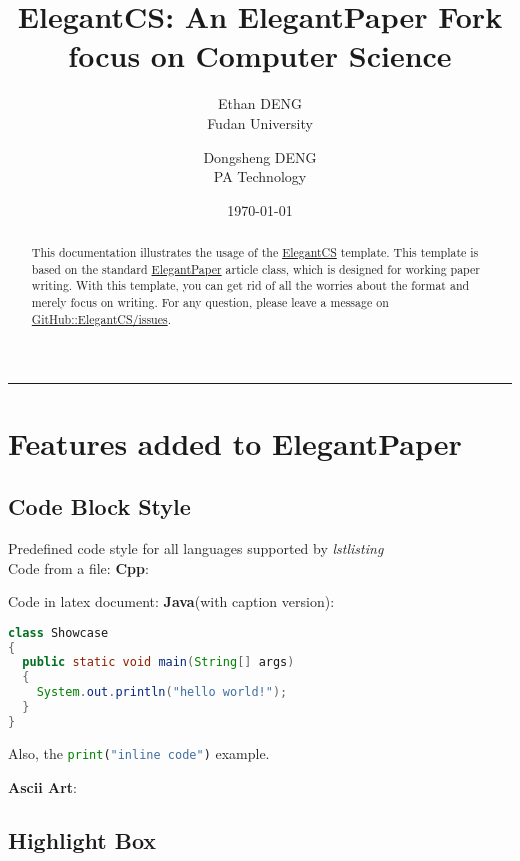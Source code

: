 \documentclass[lang=cn,a4paper,bibend=bibtex]{elegantcs}
\title{ElegantCS: An ElegantPaper Fork focus on Computer Science}
\author{Ethan DENG \\ Fudan University \and Dongsheng DENG \\ PA Technology}
\institute{\href{https://github.com/ElegantLaTeX}{Elegant\LaTeX{} Program}}
\date{\today}
\begin{document}
\maketitle

\begin{abstract}
This documentation illustrates the usage of the \href{https://github.com/Ziqi-Yang/ElegantCS}{ElegantCS} template. This template is based on the standard \href{https://github.com/ElegantLaTeX/ElegantPaper}{ElegantPaper} article class, which is designed for working paper writing. With this template, you can get rid of all the worries about the format and merely focus on writing. For any question, please leave a message on \href{https://github.com/Ziqi-Yang/ElegantCS/issues}{GitHub::ElegantCS/issues}.\par
{}
\end{abstract}


\noindent\rule{\textwidth}{1pt}

\section*{Features added to ElegantPaper}

\subsection*{Code Block Style}

Predefined code style for all languages supported by \textit{lstlisting}\\
Code from a file:
\textbf{Cpp}:


Code in latex document:
\textbf{Java}(with caption version):
\begin{lstlisting}[language=Java, caption={Showcase.java}]
class Showcase
{
  public static void main(String[] args)
  {
    System.out.println("hello world!");
  }
}
\end{lstlisting}

Also, the \lstinline[language=Python]|print("inline code")| example.

\textbf{Ascii Art}:
\setmonofont{Quivira}



\subsection*{Highlight Box}
\end{document}
